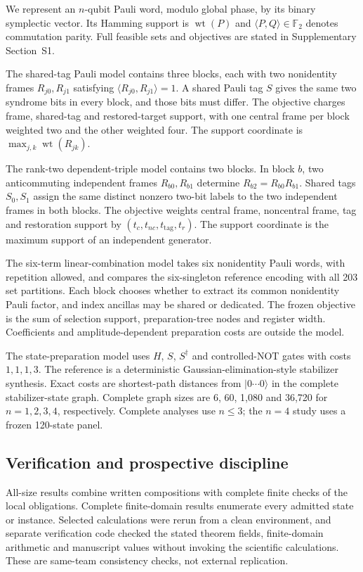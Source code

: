 We represent an $n$-qubit Pauli word, modulo global phase, by its binary symplectic vector.  Its Hamming support is $\operatorname{wt}(P)$ and $\langle P,Q\rangle\in\mathbb F_2$ denotes commutation parity.  Full feasible sets and objectives are stated in Supplementary Section~S1.

The shared-tag Pauli model contains three blocks, each with two nonidentity frames $R_{j0},R_{j1}$ satisfying $\langle R_{j0},R_{j1}\rangle=1$.  A shared Pauli tag $S$ gives the same two syndrome bits in every block, and those bits must differ.  The objective charges frame, shared-tag and restored-target support, with one central frame per block weighted two and the other weighted four.  The support coordinate is $\max_{j,k}\operatorname{wt}(R_{jk})$.

The rank-two dependent-triple model contains two blocks.  In block $b$, two anticommuting independent frames $R_{b0},R_{b1}$ determine $R_{b2}=R_{b0}R_{b1}$.  Shared tags $S_0,S_1$ assign the same distinct nonzero two-bit labels to the two independent frames in both blocks.  The objective weights central frame, noncentral frame, tag and restoration support by $(t_c,t_{nc},t_{\mathrm{tag}},t_r)$.  The support coordinate is the maximum support of an independent generator.

The six-term linear-combination model takes six nonidentity Pauli words, with repetition allowed, and compares the six-singleton reference encoding with all 203 set partitions.  Each block chooses whether to extract its common nonidentity Pauli factor, and index ancillas may be shared or dedicated.  The frozen objective is the sum of selection support, preparation-tree nodes and register width.  Coefficients and amplitude-dependent preparation costs are outside the model.

The state-preparation model uses $H$, $S$, $S^\dagger$ and controlled-NOT gates with costs $1,1,1,3$.  The reference is a deterministic Gaussian-elimination-style stabilizer synthesis.  Exact costs are shortest-path distances from $|0\cdots0\rangle$ in the complete stabilizer-state graph.  Complete graph sizes are 6, 60, 1,080 and 36,720 for $n=1,2,3,4$, respectively.  Complete analyses use $n\leq3$; the $n=4$ study uses a frozen 120-state panel.

\subsection{Verification and prospective discipline}

All-size results combine written compositions with complete finite checks of the local obligations.  Complete finite-domain results enumerate every admitted state or instance.  Selected calculations were rerun from a clean environment, and separate verification code checked the stated theorem fields, finite-domain arithmetic and manuscript values without invoking the scientific calculations.  These are same-team consistency checks, not external replication.


